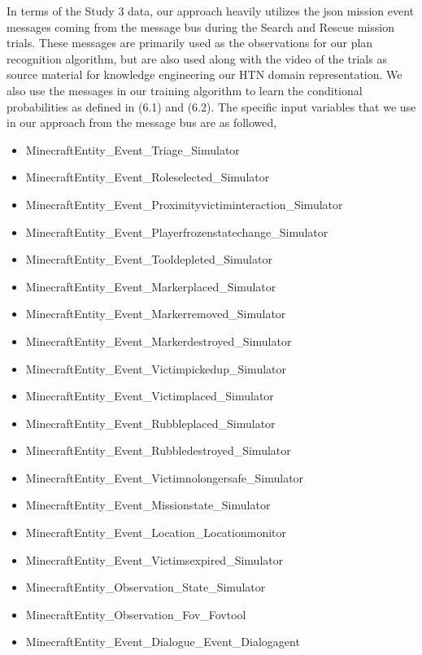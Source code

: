 In terms of the Study 3 data, our approach heavily utilizes the json mission event messages coming from the message bus during the Search and Rescue mission trials. These messages are primarily used as the observations for our plan recognition algorithm, but are also used along with the video of the trials as source material for knowledge engineering our HTN domain representation. We also use the messages in our training algorithm to learn the conditional probabilities as defined in (6.1) and (6.2). The specific input variables that we use in our approach from the message bus are as followed, 

\begin{itemize}
\item MinecraftEntity\_Event\_Triage\_Simulator
\item MinecraftEntity\_Event\_Roleselected\_Simulator
\item MinecraftEntity\_Event\_Proximityvictiminteraction\_Simulator
\item MinecraftEntity\_Event\_Playerfrozenstatechange\_Simulator
\item MinecraftEntity\_Event\_Tooldepleted\_Simulator
\item MinecraftEntity\_Event\_Markerplaced\_Simulator
\item MinecraftEntity\_Event\_Markerremoved\_Simulator
\item MinecraftEntity\_Event\_Markerdestroyed\_Simulator
\item MinecraftEntity\_Event\_Victimpickedup\_Simulator
\item MinecraftEntity\_Event\_Victimplaced\_Simulator
\item MinecraftEntity\_Event\_Rubbleplaced\_Simulator
\item MinecraftEntity\_Event\_Rubbledestroyed\_Simulator
\item MinecraftEntity\_Event\_Victimnolongersafe\_Simulator
\item MinecraftEntity\_Event\_Missionstate\_Simulator
\item MinecraftEntity\_Event\_Location\_Locationmonitor
\item MinecraftEntity\_Event\_Victimsexpired\_Simulator
\item MinecraftEntity\_Observation\_State\_Simulator
\item MinecraftEntity\_Observation\_Fov\_Fovtool
\item MinecraftEntity\_Event\_Dialogue\_Event\_Dialogagent
\end{itemize}

